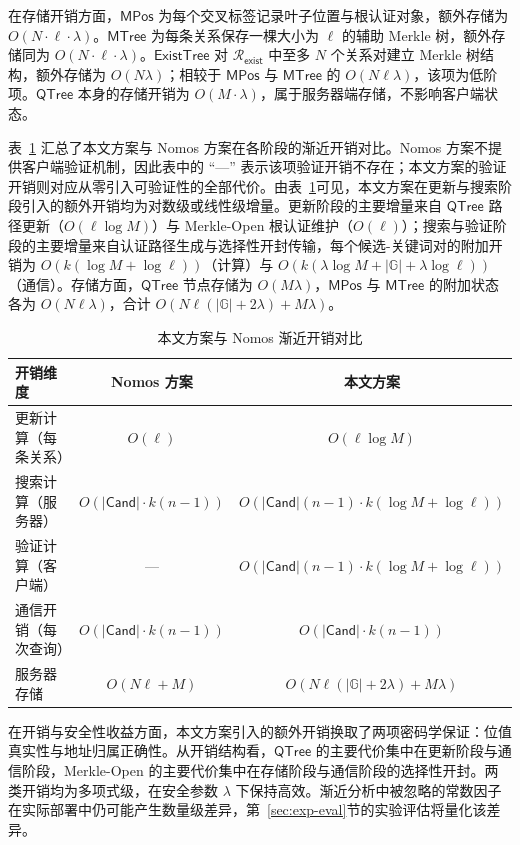 在存储开销方面，$\mathsf{MPos}$ 为每个交叉标签记录叶子位置与根认证对象，额外存储为 $O(N\cdot \ell \cdot \lambda)$。$\mathsf{MTree}$ 为每条关系保存一棵大小为 $\ell$ 的辅助 Merkle 树，额外存储同为 $O(N\cdot \ell \cdot \lambda)$。$\mathsf{ExistTree}$ 对 $\mathcal{R}_{\mathsf{exist}}$ 中至多 $N$ 个关系对建立 Merkle 树结构，额外存储为 $O(N\lambda)$；相较于 $\mathsf{MPos}$ 与 $\mathsf{MTree}$ 的 $O(N\ell\lambda)$，该项为低阶项。$\mathsf{QTree}$ 本身的存储开销为 $O(M\cdot\lambda)$，属于服务器端存储，不影响客户端状态。

表~\ref{tab:overhead-compare} 汇总了本文方案与 Nomos 方案在各阶段的渐近开销对比。Nomos 方案不提供客户端验证机制，因此表中的 ``---'' 表示该项验证开销不存在；本文方案的验证开销则对应从零引入可验证性的全部代价。由表~\ref{tab:overhead-compare}可见，本文方案在更新与搜索阶段引入的额外开销均为对数级或线性级增量。更新阶段的主要增量来自 $\mathsf{QTree}$ 路径更新（$O(\ell\log M)$）与 Merkle-Open 根认证维护（$O(\ell)$）；搜索与验证阶段的主要增量来自认证路径生成与选择性开封传输，每个候选-关键词对的附加开销为 $O(k(\log M+\log\ell))$（计算）与 $O(k(\lambda\log M+|\mathbb{G}|+\lambda\log\ell))$（通信）。存储方面，$\mathsf{QTree}$ 节点存储为 $O(M\lambda)$，$\mathsf{MPos}$ 与 $\mathsf{MTree}$ 的附加状态各为 $O(N\ell\lambda)$，合计 $O(N\ell(|\mathbb{G}|+2\lambda)+M\lambda)$。

\begin{table}[h]
\centering
\footnotesize
\caption{本文方案与 Nomos 渐近开销对比}
\label{tab:overhead-compare}
\begin{tabular}{@{}lcc@{}}
\toprule
开销维度 & Nomos 方案 & 本文方案 \\
\midrule
更新计算（每条关系） & $O(\ell)$ & $O(\ell\log M)$ \\
搜索计算（服务器） & $O(|\mathsf{Cand}|\cdot k(n{-}1))$ & $O(|\mathsf{Cand}|(n{-}1)\cdot k(\log M{+}\log\ell))$ \\
验证计算（客户端） & --- & $O(|\mathsf{Cand}|(n{-}1)\cdot k(\log M{+}\log\ell))$ \\
通信开销（每次查询） & $O(|\mathsf{Cand}|\cdot k(n{-}1))$ & $O(|\mathsf{Cand}|\cdot k(n{-}1))$ \\
服务器存储 & $O(N\ell+M)$ & $O(N\ell(|\mathbb{G}|{+}2\lambda)+M\lambda)$ \\
\bottomrule
\end{tabular}
\end{table}

在开销与安全性收益方面，本文方案引入的额外开销换取了两项密码学保证：位值真实性与地址归属正确性。从开销结构看，$\mathsf{QTree}$ 的主要代价集中在更新阶段与通信阶段，Merkle-Open 的主要代价集中在存储阶段与通信阶段的选择性开封。两类开销均为多项式级，在安全参数 $\lambda$ 下保持高效。渐近分析中被忽略的常数因子在实际部署中仍可能产生数量级差异，第~\ref{sec:exp-eval}节的实验评估将量化该差异。

